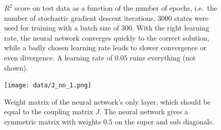\documentclass[11pt,british,a4paper]{article}
\numberwithin{equation}{section}
\begin{document}
\begin{figure}[H]
    \centering
    \caption{\(R^2\) score on test data as a function of the number of epochs, i.e.\ the number of stochastic gradient descent iterations. \(\num{3000}\) states were used for training with a batch size of \(300\). With the right learning rate, the neural network converges quickly to the correct solution, while a badly chosen learning rate leads to slower convergence or even divergence. A learning rate of \(\num{0.05}\) ruins everything (not shown).}\label{fig:r2nn}
\end{figure}

\begin{figure}[H]
    \centering
    \texttt{[image: data/J\_nn\_1.png]}
    \caption{Weight matrix of the neural network's only layer, which should be equal to the coupling matrix \(J\). The neural network gives a symmetric matrix with weights \(\num{0.5}\) on the super and sub diagonals.}
\end{figure}
\end{document}
